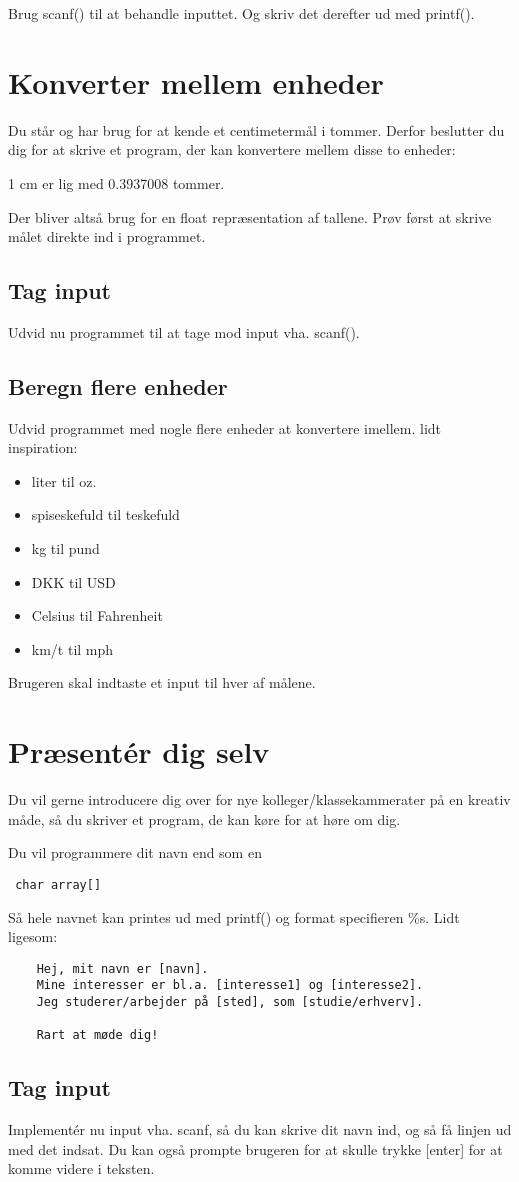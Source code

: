\documentclass[hidelinks]{article} %
\begin{document}
Brug scanf() til at behandle inputtet. Og skriv det derefter ud med printf().

	\section{Konverter mellem enheder}
Du står og har brug for at kende et centimetermål i tommer. Derfor beslutter du dig for at skrive et program, der kan konvertere mellem disse to enheder:

1 cm er lig med 0.3937008 tommer.

Der bliver altså brug for en float repræsentation af tallene.
Prøv først at skrive målet direkte ind i programmet.

	\subsection{Tag input}
Udvid nu programmet til at tage mod input vha. scanf().

	\subsection{Beregn flere enheder}
Udvid programmet med nogle flere enheder at konvertere imellem. lidt inspiration:

\begin{itemize}
	\item{liter til oz.}
	\item{spiseskefuld til teskefuld}
	\item{kg til pund}
	\item{DKK til USD}
	\item{Celsius til Fahrenheit}
	\item{km/t til mph}
\end{itemize}

Brugeren skal indtaste et input til hver af målene.

	\section{Præsentér dig selv}
Du vil gerne introducere dig over for nye kolleger/klassekammerater på en kreativ måde, så du skriver et program, de kan køre for at høre om dig.

Du vil programmere dit navn end som en
\begin{verbatim} char array[]
\end{verbatim}
Så hele navnet kan printes ud med printf() og format specifieren \%s.
Lidt ligesom:
\begin{verbatim}
	Hej, mit navn er [navn].
	Mine interesser er bl.a. [interesse1] og [interesse2].
	Jeg studerer/arbejder på [sted], som [studie/erhverv].
	
	Rart at møde dig!
\end{verbatim}
	\subsection{Tag input}
	Implementér nu input vha. scanf, så du kan skrive dit navn ind, og så få linjen ud med det indsat. Du kan også prompte brugeren for at skulle trykke [enter] for at komme videre i teksten.
\end{document}

